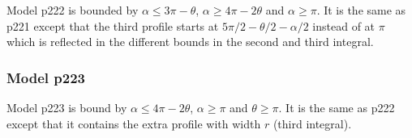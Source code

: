 Model p222 is bounded by $\alpha \le 3\pi - \theta$, $\alpha \ge 4\pi - 2\theta$ and $\alpha \ge \pi$. It is the same as p221 except that the third profile starts at $5\pi/2 - \theta/2 - \alpha/2$ instead of at $\pi$ which is reflected in the different bounds in the second and third integral.



\subsubsection{Model p223} \label{p223}

Model p223 is bound by $\alpha \le 4\pi - 2\theta$, $\alpha \ge \pi$ and $\theta \ge \pi$. It is the same as p222 except that it contains the extra profile with width $r$ (third integral).






